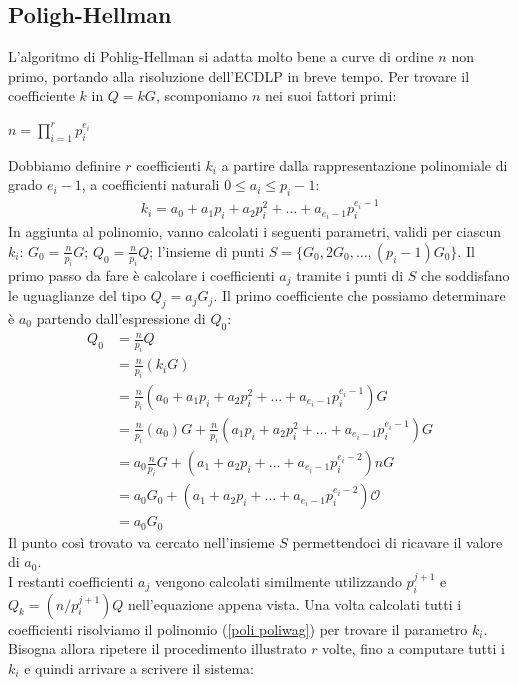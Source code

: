 \documentclass[a4paper,12pt]{tesiinfo}
\newcommand\ddfrac[2]{\frac{\displaystyle #1}{\displaystyle #2}}
\begin{document}
\subsection{Poligh-Hellman}
\label{poliwag}
L'algoritmo di Pohlig-Hellman \cite{rho for poliwag} si adatta molto bene a curve di ordine $n$ non primo, portando alla risoluzione dell'ECDLP in breve tempo. Per trovare il coefficiente $k$ in $Q=kG$, scomponiamo $n$ nei suoi fattori primi:
\begin{center}
$n={\displaystyle \prod_{i=1}^{r} p_i^{e_i}}$
\end{center}
Dobbiamo definire $r$ coefficienti $k_i$ a partire dalla rappresentazione polinomiale di grado $e_i-1$, a coefficienti naturali $0 \leq a_i \leq p_i-1$:
\begin{align}
k_i = a_0 + a_1p_i + a_2p_i^2 + \ldots + a_{e_i-1}p_i^{e_i-1}
\label{poli poliwag}
\end{align}
In aggiunta al polinomio, vanno calcolati i seguenti parametri, validi per ciascun $k_i$: $G_0 = \ddfrac{n}{p_i}G$; $Q_0 = \ddfrac{n}{p_i}Q$; l'insieme di punti $S = \{G_0, 2G_0, \ldots, (p_i-1)G_0\}$. Il primo passo da fare \`e calcolare i coefficienti $a_j$ tramite i punti di $S$ che soddisfano le uguaglianze del tipo $Q_j = a_jG_j$. Il primo coefficiente che possiamo determinare \`e $a_0$ partendo dall'espressione di $Q_0$:
\begin{align*}
Q_0 &= \ddfrac{n}{p_i}Q \\
&= \ddfrac{n}{p_i}(k_iG) \\
&= \ddfrac{n}{p_i}(a_0 + a_1p_i + a_2p_i^2 + \ldots + a_{e_i-1}p_i^{e_i-1})G\\
&= \ddfrac{n}{p_i}(a_0)G + \ddfrac{n}{p_i}(a_1p_i + a_2p_i^2 + \ldots + a_{e_i-1}p_i^{e_i-1})G\\
&= a_0\ddfrac{n}{p_i}G + (a_1 + a_2p_i + \ldots + a_{e_i-1}p_i^{e_i-2})nG\\
&= a_0G_0 + (a_1 + a_2p_i + \ldots + a_{e_i-1}p_i^{e_i-2})\mathcal{O}\\
&= a_0G_0
\end{align*}
Il punto cos\`i trovato va cercato nell'insieme $S$ permettendoci di ricavare il valore di $a_0$.
\\
I restanti coefficienti $a_j$ vengono calcolati similmente utilizzando $p_i^{j+1}$ e $Q_k=(n \big / p_i^{j+1})Q$ nell'equazione appena vista. Una volta calcolati tutti i coefficienti risolviamo il polinomio (\ref{poli poliwag}) per trovare il parametro $k_i$. Bisogna allora ripetere il procedimento illustrato $r$ volte, fino a computare tutti i $k_i$ e quindi arrivare a scrivere il sistema:
\end{document}
